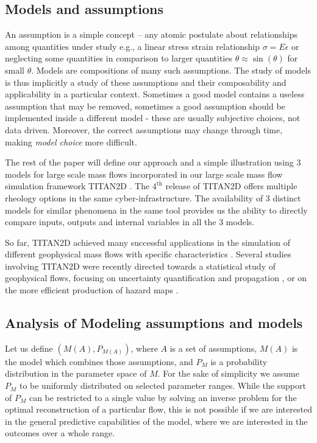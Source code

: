 \documentclass{article}
\begin{document}
\subsection{Models and assumptions}
An assumption is a simple concept -- any atomic postulate about relationships among quantities under study  e.g., a linear stress strain relationship $\sigma=E\epsilon$ or neglecting some quantities in comparison to larger quantities $\theta \approx \sin (\theta) $ for small $\theta$. Models are  compositions of many such assumptions. The study of models is thus implicitly a study of these assumptions and their composability and applicability in a particular context. Sometimes a good model contains a useless assumption that may be removed, sometimes a good assumption should be implemented inside a different model - these are usually subjective choices, not data driven. Moreover, the correct assumptions may change through time, making {\em model choice} more difficult.

The rest of the paper will define our approach and a simple illustration using 3 models for large scale mass flows incorporated in our large scale mass flow simulation framework  TITAN2D \citep{Patra2005,Patra2006, Yu2009, Aghakhani2016}. The $\mathrm{4^{\mathrm{th}}}$ release of TITAN2D offers multiple rheology options in the same cyber-infrastructure. The availability of 3 distinct models for similar phenomena in the same tool provides us the  ability to directly compare inputs, outputs and internal variables in all the 3 models.

So far, TITAN2D achieved many successful applications in the simulation of different geophysical mass flows with specific characteristics \citep{Sheridan2005, Rupp2006, Norini2008, Charbonnier2009, Procter2010, Sheridan2010, Sulpizio2010, Capra2011}. Several studies involving TITAN2D were recently directed towards a statistical study of geophysical flows, focusing on uncertainty quantification and propagation \citep{Dalbey2008, Dalbey2009, Stefanescu2012b, Stefanescu2012a}, or on the more efficient production of hazard maps \citep{Bayarri2009, Spiller2014,Bayarri2015, Ogburn2016}.

\subsection{Analysis of Modeling assumptions and models }
Let us define $\left(M(A), P_{M(A)}\right)$, where $A$ is a set of assumptions, $M(A)$ is the model which combines those assumptions, and $P_M$ is a probability distribution in the parameter space of $M$. For the sake of simplicity we assume $P_M$ to be uniformly distributed on selected parameter ranges. While the support of $P_M$ can be restricted to a single value by solving an inverse problem   for the optimal reconstruction of a particular flow, this is not possible if we are interested in the general predictive capabilities of the model, where we are interested in the outcomes over a whole range.
\end{document}
